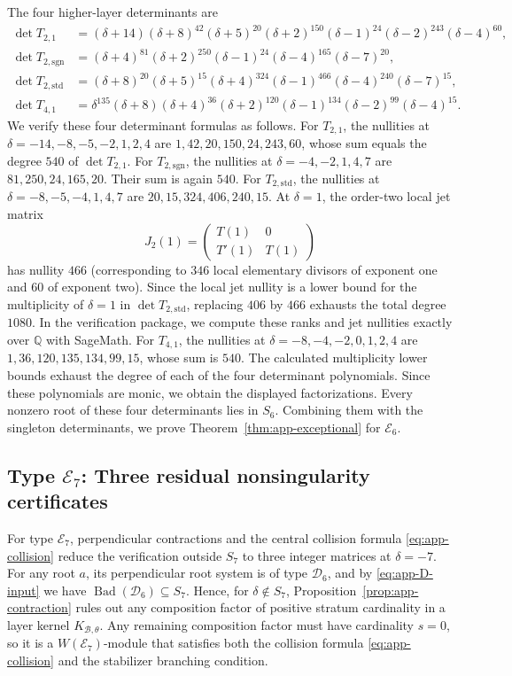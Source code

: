 \documentclass[11pt,a4paper]{amsart}
\theoremstyle{uprightdefinition}
\theoremstyle{remark}\newtheorem{remark}[theorem]{Remark}
\begin{document}
The four higher-layer determinants are
\begin{align*}
 \det T_{2,1}&=(\delta+14)(\delta+8)^{42}(\delta+5)^{20}
 (\delta+2)^{150}(\delta-1)^{24}(\delta-2)^{243}(\delta-4)^{60},\\
 \det T_{2,\mathrm{sgn}}&=(\delta+4)^{81}(\delta+2)^{250}
 (\delta-1)^{24}(\delta-4)^{165}(\delta-7)^{20},\\
 \det T_{2,\mathrm{std}}&=(\delta+8)^{20}(\delta+5)^{15}
 (\delta+4)^{324}(\delta-1)^{466}(\delta-4)^{240}(\delta-7)^{15},\\
 \det T_{4,1}&=\delta^{135}(\delta+8)(\delta+4)^{36}
 (\delta+2)^{120}(\delta-1)^{134}(\delta-2)^{99}(\delta-4)^{15}.
\end{align*}
We verify these four determinant formulas as follows. For $T_{2,1}$,
the nullities at $\delta=-14,-8,-5,-2,1,2,4$ are
$1,42,20,150,24,243,60$, whose sum equals the degree $540$ of $\det T_{2,1}$.
For $T_{2,\mathrm{sgn}}$, the nullities at
$\delta=-4,-2,1,4,7$ are $81,250,24,165,20$.
Their sum is again $540$.
For $T_{2,\mathrm{std}}$, the nullities at $\delta=-8,-5,-4,1,4,7$ are
$20,15,324,406,240,15$. At $\delta=1$, the order-two local jet matrix
\[
 J_2(1)=\begin{pmatrix}T(1)&0\\T'(1)&T(1)\end{pmatrix}
\]
has nullity $466$ (corresponding to $346$ local elementary divisors of exponent one
and $60$ of exponent two). Since the local jet nullity is a lower
bound for the multiplicity of $\delta=1$ in $\det T_{2,\mathrm{std}}$, replacing $406$ by $466$ exhausts
the total degree $1080$.
In the verification package, we compute these ranks and jet nullities
exactly over $\mathbb Q$ with SageMath.
For $T_{4,1}$, the nullities at $\delta=-8,-4,-2,0,1,2,4$
are $1,36,120,135,134,99,15$, whose sum is $540$.
The calculated multiplicity lower bounds exhaust the degree of each
of the four determinant polynomials. Since these polynomials are monic,
we obtain the displayed factorizations.
Every nonzero root of these four determinants lies in $S_6$.
Combining them with the singleton determinants, we prove Theorem~\ref{thm:app-exceptional} for $\mathscr{E}_6$.


\subsection{Type \texorpdfstring{$\mathscr{E}_7$}{E7}: Three residual nonsingularity certificates}
For type $\mathscr{E}_7$, perpendicular contractions and the central collision formula \eqref{eq:app-collision}
reduce the verification outside $S_7$ to three integer matrices at $\delta=-7$.
For any root $a$, its perpendicular root system is of type $\mathscr{D}_6$, and by \eqref{eq:app-D-input} we have
$\operatorname{Bad}(\mathscr{D}_6)\subseteq S_7$.
Hence, for $\delta\notin S_7$, Proposition~\ref{prop:app-contraction} rules out any
composition factor of positive stratum cardinality in a layer kernel $K_{\mathcal B,\theta}$.
Any remaining composition factor must have cardinality $s=0$, so it is a $W(\mathscr{E}_7)$-module that
satisfies both the collision formula \eqref{eq:app-collision} and the stabilizer branching condition.
\end{document}

